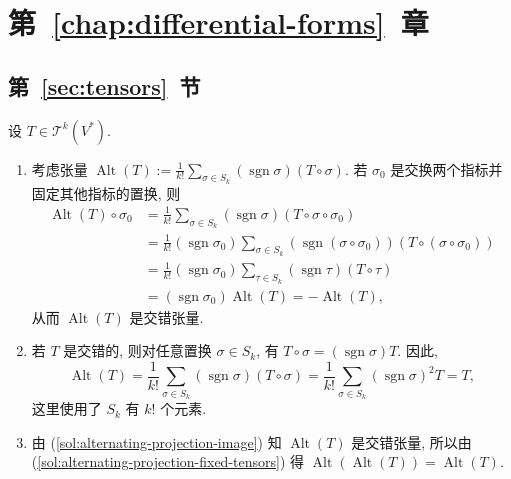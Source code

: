 \section{\texorpdfstring{第~\ref{chap:differential-forms}~章}{微分形式}}\label{sec:solutions-differential-forms}
\subsection{\texorpdfstring{第~\ref{sec:tensors}~节}{张量}}\label{subsec:solutions-tensors}

\begin{description}[font=\normalfont,leftmargin=2em,labelwidth=1.5em]
设 $T\in\mathcal T^k(V^*)$.
\begin{enumerate}[label=(\alph*),ref=\alph*,leftmargin=*]
\item\label{sol:alternating-projection-image} 考虑张量 $\operatorname{Alt}(T):=\frac{1}{k!}\sum_{\sigma\in S_k}(\operatorname{sgn}\sigma)(T\circ\sigma)$. 若 $\sigma_0$ 是交换两个指标并固定其他指标的置换, 则
\begin{align*}
  \operatorname{Alt}(T)\circ\sigma_0
  &=\frac{1}{k!}\sum_{\sigma\in S_k}(\operatorname{sgn}\sigma)(T\circ\sigma\circ\sigma_0)\\
  &=\frac{1}{k!}(\operatorname{sgn}\sigma_0)
    \sum_{\sigma\in S_k}(\operatorname{sgn}(\sigma\circ\sigma_0))(T\circ(\sigma\circ\sigma_0))\\
  &=\frac{1}{k!}(\operatorname{sgn}\sigma_0)
    \sum_{\tau\in S_k}(\operatorname{sgn}\tau)(T\circ\tau)\\
  &=(\operatorname{sgn}\sigma_0)\operatorname{Alt}(T)=-\operatorname{Alt}(T),
\end{align*}
从而 $\operatorname{Alt}(T)$ 是交错张量.
\item\label{sol:alternating-projection-fixed-tensors} 若 $T$ 是交错的, 则对任意置换 $\sigma\in S_k$, 有 $T\circ\sigma=(\operatorname{sgn}\sigma)T$. 因此,
\[
  \operatorname{Alt}(T)=\frac{1}{k!}\sum_{\sigma\in S_k}(\operatorname{sgn}\sigma)(T\circ\sigma)
  =\frac{1}{k!}\sum_{\sigma\in S_k}(\operatorname{sgn}\sigma)^2T=T,
\]
这里使用了 $S_k$ 有 $k!$ 个元素.
\item 由 (\ref{sol:alternating-projection-image}) 知 $\operatorname{Alt}(T)$ 是交错张量, 所以由 (\ref{sol:alternating-projection-fixed-tensors}) 得 $\operatorname{Alt}(\operatorname{Alt}(T))=\operatorname{Alt}(T)$.
\end{enumerate}


\end{description}
